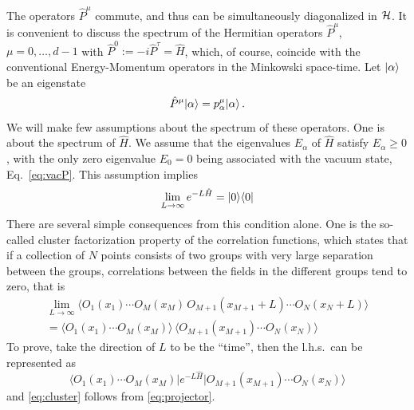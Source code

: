 The operators $\hat P^\mu$ commute, and thus can be simultaneously diagonalized in
$\mathcal{H}$. It is convenient to discuss the spectrum of the Hermitian operators
$\hat P^\mu$, $\mu=0,\dots,d-1$ with $\hat P^0:=-i\hat P^\tau=\hat H$, which, of
course, coincide with the conventional Energy-Momentum operators in the Minkowski
space-time. Let $|\alpha\rangle$ be an eigenstate
\[
\hat P^\mu|\alpha\rangle=p^\mu_\alpha|\alpha\rangle\,.
\]
We will make few assumptions about the spectrum of these operators. One is about
the spectrum of $\hat H$. We assume that the eigenvalues $E_\alpha$ of $\hat H$
satisfy $E_\alpha\ge0$, with the only zero eigenvalue $E_0=0$ being associated with
the vacuum state, Eq.~\eqref{eq:vacP}. This assumption implies
\begin{equation}\label{eq:projector}
\lim_{L\to\infty}e^{-L\hat H}=|0\rangle\langle 0|
\end{equation}
There are several simple consequences from this condition alone. One is the
so-called cluster factorization property of the correlation functions, which states
that if a collection of $N$ points consists of two groups with very large separation
between the groups, correlations between the fields in the different groups tend to
zero, that is
\begin{multline}\label{eq:cluster}
\lim_{L\to\infty}\bigl\langle O_1(x_1)\cdots O_M(x_M)\,O_{M+1}(x_{M+1}+L)\cdots O_N(x_N+L)\bigr\rangle\\
=\bigl\langle O_1(x_1)\cdots O_M(x_M)\bigr\rangle\,\bigl\langle O_{M+1}(x_{M+1})\cdots O_N(x_N)\bigr\rangle
\end{multline}
To prove, take the direction of $L$ to be the ``time'', then the l.h.s.\ can be
represented as
\[
\bigl\langle O_1(x_1)\cdots O_M(x_M)\big|e^{-L\hat H}\big|O_{M+1}(x_{M+1})\cdots O_N(x_N)\bigr\rangle
\]
and \eqref{eq:cluster} follows from \eqref{eq:projector}.

